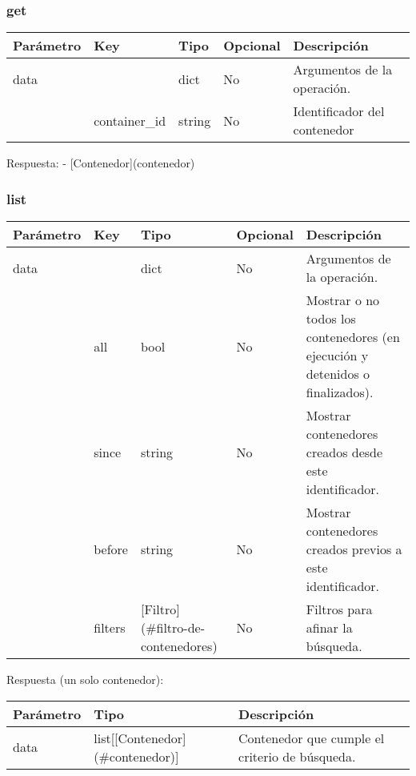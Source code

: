 		\subsubsection{get}
			\begin{table}[!h]
				\centering
	\begin{adjustbox}{max width=\textwidth}
				\begin{tabular}{|l|l|l|l|l|}
					\hline
					Parámetro & Key & Tipo & Opcional & Descripción \\ \hline
					data &  & dict & No & Argumentos de la operación. \\ \hline
					& container\_id & string & No & Identificador del contenedor \\ \hline
				\end{tabular}
\end{adjustbox}
			\end{table}
		
			Respuesta:
			- [Contenedor](contenedor)
			
		\subsubsection{list}
			\begin{table}[!h]
				\centering
	\begin{adjustbox}{max width=\textwidth}
				\begin{tabular}{|l|l|l|l|l|}
					\hline
					Parámetro & Key & Tipo & Opcional & Descripción \\ \hline
					data &  & dict & No & Argumentos de la operación. \\ \hline
					& all & bool & No & Mostrar o no todos los contenedores (en ejecución y detenidos o finalizados). \\ \hline
					& since & string & No & Mostrar contenedores creados desde este identificador. \\ \hline
					& before & string & No & Mostrar contenedores creados previos a este identificador. \\ \hline
					& filters & [Filtro](\#filtro-de-contenedores) & No & Filtros para afinar la búsqueda. \\ \hline
				\end{tabular}
\end{adjustbox}
			\end{table}
		
			Respuesta (un solo contenedor):
			\begin{table}[!h]
				\centering
	\begin{adjustbox}{max width=\textwidth}
				\begin{tabular}{|l|l|l|}
					\hline
					Parámetro & Tipo & Descripción \\ \hline
					data & list[[Contenedor](\#contenedor)] & Contenedor que cumple el criterio de búsqueda. \\ \hline
				\end{tabular}
\end{adjustbox}
			\end{table}
		
